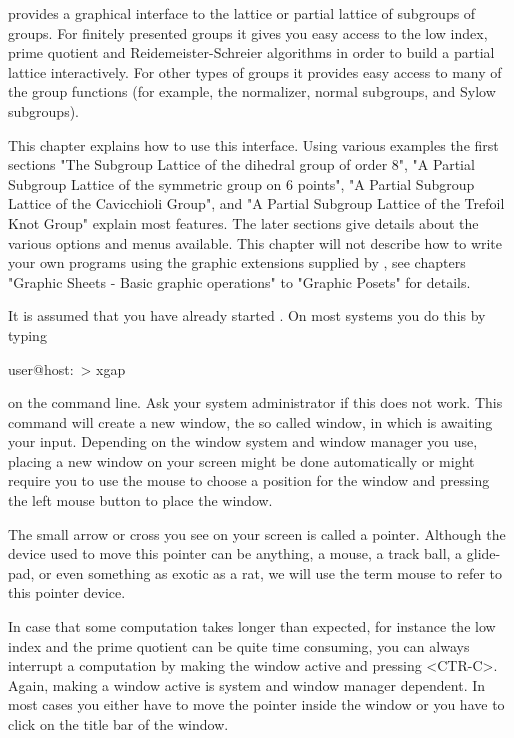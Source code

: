 
{\XGAP} provides a graphical interface to the  lattice or partial lattice
of subgroups of groups.  For finitely  presented groups it gives you easy
access to the   low  index,  prime quotient   and   Reidemeister-Schreier
algorithms in order to build a partial  lattice interactively.  For other
types of groups  it provides easy access to  many of  the group functions
(for example, the normalizer, normal subgroups, and Sylow subgroups).

This chapter explains how to use this interface.  Using various examples
the first sections "The Subgroup Lattice of the dihedral group of order 8",
"A Partial Subgroup Lattice of the symmetric group on 6 points", "A Partial
Subgroup Lattice of the Cavicchioli Group", and "A Partial Subgroup Lattice
of the Trefoil Knot Group" explain most features.  The later sections
give details about the various options and menus available.  This chapter
will not describe how to write your own programs using the graphic
extensions supplied by {\XGAP}, see chapters "Graphic Sheets - Basic graphic
operations" to "Graphic Posets" for details.

It is assumed that you have already started {\XGAP}.  On most systems you
do this by typing

\begintt 
user@host:~> xgap 
\endtt

on  the  command line.   Ask your  system administrator  if this does not
work.  This   command  will create   a new window,   the so called {\GAP}
window, in which {\GAP} is awaiting your input.   Depending on the window
system and window manager  you use, placing a new  window on your  screen
might be  done  automatically or might  require  you to use the  mouse to
choose a position for the  window and pressing the  left mouse button  to
place the window.

The small arrow   or cross you see on   your screen is  called a pointer.
Although the device used to move this pointer can be anything, a mouse, a
track ball, a glide-pad, or even something as exotic as a rat, we will use
the term mouse to refer to this pointer device.

In  case that some computation  takes  longer than expected, for instance
the low index and the prime quotient can be quite time consuming, you can
always interrupt  a computation  by  making the {\GAP}  window active and
pressing <CTR-C>.  Again, making  a  window active  is system and  window
manager dependent.   In most cases  you either have  to  move the pointer
inside  the {\GAP} window or you  have to click on the   title bar of the
{\GAP} window.

